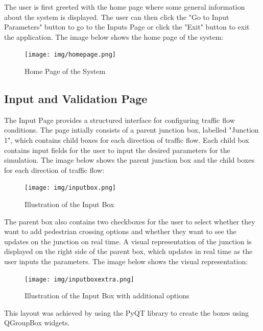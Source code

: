 \documentclass{article}
\begin{document}
        The user is first greeted with the home page where some general information about the system is displayed. The user can then click the "Go to Input Parameters" button to go to the Inputs Page 
        or click the "Exit" button to exit the application. The image below shows the home page of the system:

        \begin{figure}[H]
            \centering
            \texttt{[image: img/homepage.png]}
            \caption{Home Page of the System}
            \label{fig:homepage}
        \end{figure}
    
    \subsection{Input and Validation Page}

        The Input Page provides a structured interface for configuring traffic flow conditions. The page intially consists of a parent junction box, labelled "Junction 1", which contains child boxes for 
        each direction of traffic flow. Each child box contains input fields for the user to input the desired parameters for the simulation. The image below shows the parent junction box and the child boxes for
        each direction of traffic flow:
        
        \begin{figure}[h!]
            \centering
            \texttt{[image: img/inputbox.png]}
            \caption{Illustration of the Input Box}
            \label{fig:inputBox}
        \end{figure}

        The parent box also contains two checkboxes for the user to select whether they want to add pedestrian crossing options and whether they want to see the updates on the junction on real time. A visual representation of the
        junction is displayed on the right side of the parent box, which updates in real time as the user inputs the parameters. The image below shows the visual representation:

        \begin{figure}[H]
            \centering
            \texttt{[image: img/inputboxextra.png]}
            \caption{Illustration of the Input Box with additional options}
            \label{fig:inputBox}
        \end{figure}

        This layout was achieved by using the PyQT library to create the boxes using QGroupBox widgets.
\end{document}
